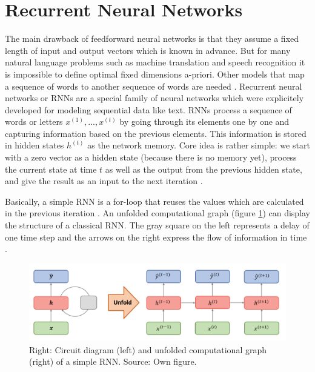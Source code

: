 \documentclass[]{krantz}
\begin{document}
\hypertarget{recurrent-neural-networks}{%
\section{Recurrent Neural Networks}\label{recurrent-neural-networks}}

The main drawback of feedforward neural networks is that they assume a fixed length of input and output vectors which is known in advance. But for many natural language problems such as machine translation and speech recognition it is impossible to define optimal fixed dimensions a-priori. Other models that map a sequence of words to another sequence of words are needed \citep{sutskever2014sequence}. Recurrent neural networks or RNNs are a special family of neural networks which were explicitely developed for modeling sequential data like text. RNNs process a sequence of words or letters \(x^{(1)}, ..., x^{(t)}\) by going through its elements one by one and capturing information based on the previous elements. This information is stored in hidden states \(h^{(t)}\) as the network memory. Core idea is rather simple: we start with a zero vector as a hidden state (because there is no memory yet), process the current state at time \(t\) as well as the output from the previous hidden state, and give the result as an input to the next iteration \citep{goodfellow2016deep}.

Basically, a simple RNN is a for-loop that reuses the values which are calculated in the previous iteration \citep{chollet2018deep}. An unfolded computational graph (figure \ref{fig:01-00-unfolded}) can display the structure of a classical RNN. The gray square on the left represents a delay of one time step and the arrows on the right express the flow of information in time \citep{goodfellow2016deep}.

\begin{figure}

{\centering \includegraphics[width=1\linewidth]{figures/01-00-deep-learning-for-nlp/01_02_unfolded_graph} 

}

\caption{Right: Circuit diagram (left) and unfolded computational graph (right) of a simple RNN. Source: Own figure.}\label{fig:01-00-unfolded}
\end{figure}
\end{document}
